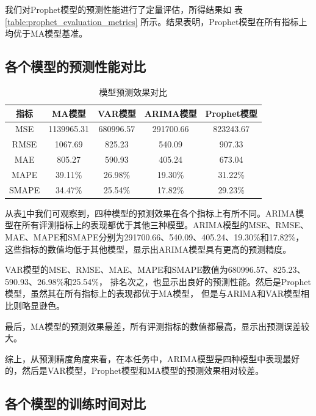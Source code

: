 \documentclass[a4paper,AutoFakeBold,oneside,12pt]{book}
\begin{document}
我们对Prophet模型的预测性能进行了定量评估，所得结果如 表 \ref{table:prophet_evaluation_metrics}
所示。结果表明，Prophet模型在所有指标上均优于MA模型基准。

\subsection{各个模型的预测性能对比}


\begin{table}[h]
    \centering
    \caption{模型预测效果对比}
    \label{table:model_evaluation_metrics_comparison}
    \begin{tabular}{c|c|c|c|c}
        \hline
        \textbf{指标} & \textbf{MA模型} & \textbf{VAR模型} & \textbf{ARIMA模型} & \textbf{Prophet模型} \\
        \hline
        MSE & 1139965.31 & 680996.57 & 291700.66 & 823243.67 \\
        RMSE & 1067.69 & 825.23 & 540.09 & 907.33 \\
        MAE & 805.27 & 590.93 & 405.24 & 673.04 \\
        MAPE & 39.11\% & 26.98\% & 19.30\% & 31.22\% \\
        SMAPE & 34.47\% & 25.54\% & 17.82\% & 29.23\% \\
        \hline
    \end{tabular}
\end{table}

从表\ref{table:model_evaluation_metrics_comparison}中我们可观察到，四种模型的预测效果在各个指标上有所不同。ARIMA模型在所有评测指标上的表现都优于其他三种模型。ARIMA模型的MSE、RMSE、MAE、MAPE和SMAPE分别为291700.66、540.09、405.24、19.30\%和17.82\%，这些指标的数值均低于其他模型，显示出ARIMA模型具有更高的预测精度。

VAR模型的MSE、RMSE、MAE、MAPE和SMAPE数值为680996.57、825.23、590.93、26.98\%和25.54\%，
排名次之，也显示出良好的预测性能。然后是Prophet模型，虽然其在所有指标上的表现都优于MA模型，
但是与ARIMA和VAR模型相比则略显逊色。

最后，MA模型的预测效果最差，所有评测指标的数值都最高，显示出预测误差较大。

综上，从预测精度角度来看，在本任务中，ARIMA模型是四种模型中表现最好的，然后是VAR模型，Prophet模型和MA模型的预测效果相对较差。

\subsection{各个模型的训练时间对比}
\end{document}
